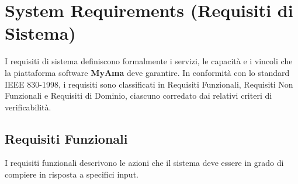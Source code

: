 \section{System Requirements (Requisiti di Sistema)}

I requisiti di sistema definiscono formalmente i servizi, le capacità e i vincoli che la piattaforma software \textbf{MyAma} deve garantire. In conformità con lo standard IEEE 830-1998, i requisiti sono classificati in Requisiti Funzionali, Requisiti Non Funzionali e Requisiti di Dominio, ciascuno corredato dai relativi criteri di verificabilità.

\subsection{Requisiti Funzionali}
I requisiti funzionali descrivono le azioni che il sistema deve essere in grado di compiere in risposta a specifici input.


